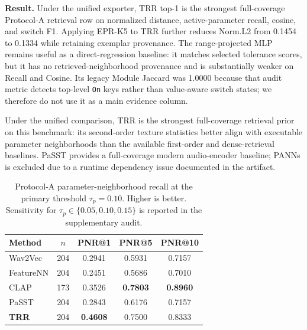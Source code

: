 \textbf{Result.} Under the unified exporter, TRR top-1 is the strongest full-coverage Protocol-A retrieval row on normalized distance, active-parameter recall, cosine, and switch F1. Applying EPR-K5 to TRR further reduces Norm.L2 from 0.1454 to 0.1334 while retaining exemplar provenance. The range-projected MLP remains useful as a direct-regression baseline: it matches selected tolerance scores, but it has no retrieved-neighborhood provenance and is substantially weaker on Recall and Cosine. Its legacy Module Jaccard was 1.0000 because that audit metric detects top-level \texttt{On} keys rather than value-aware switch states; we therefore do not use it as a main evidence column.

Under the unified comparison, TRR is the strongest full-coverage retrieval prior on this benchmark: its second-order texture statistics better align with executable parameter neighborhoods than the available first-order and dense-retrieval baselines. PaSST provides a full-coverage modern audio-encoder baseline; PANNs is excluded due to a runtime dependency issue documented in the artifact.

\begin{table}[t]
\centering
\caption{Protocol-A parameter-neighborhood recall at the primary threshold $\tau_p=0.10$. Higher is better. Sensitivity for $\tau_p\in\{0.05,0.10,0.15\}$ is reported in the supplementary audit.}
\label{tab:pnr_results}
\small
\setlength{\tabcolsep}{5pt}
\begin{tabular}{lcccc}
\toprule
\textbf{Method} & \textbf{$n$} & \textbf{PNR@1} & \textbf{PNR@5} & \textbf{PNR@10} \\
\midrule
Wav2Vec & 204 & 0.2941 & 0.5931 & 0.7157 \\
FeatureNN & 204 & 0.2451 & 0.5686 & 0.7010 \\
CLAP & 173 & 0.3526 & \textbf{0.7803} & \textbf{0.8960} \\
PaSST & 204 & 0.2843 & 0.6176 & 0.7157 \\
\textbf{TRR} & 204 & \textbf{0.4608} & 0.7500 & 0.8333 \\
\bottomrule
\end{tabular}
\end{table}

